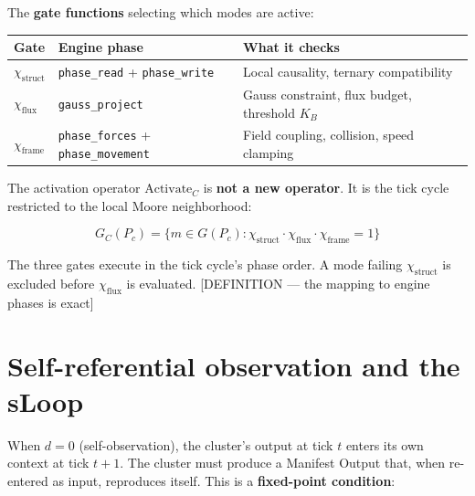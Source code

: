 \documentclass[
  11pt,
  letterpaper,
  twoside,
  openany]{book}
\makeatletter
\let\orig@section\section
\renewcommand{\section}{\needspace{8\baselineskip}\orig@section}
\makeatother
\begin{document}
The \textbf{gate functions} selecting which modes are active:

\begin{longtable}[]{@{}
  >{\raggedright\arraybackslash}p{}
  >{\raggedright\arraybackslash}p{}
  >{\raggedright\arraybackslash}p{}@{}}
\toprule\noalign{}
\begin{minipage}[b]{\linewidth}\raggedright
Gate
\end{minipage} & \begin{minipage}[b]{\linewidth}\raggedright
Engine phase
\end{minipage} & \begin{minipage}[b]{\linewidth}\raggedright
What it checks
\end{minipage} \\
\midrule\noalign{}
\endhead
\bottomrule\noalign{}
\endlastfoot
\(\chi_{\text{struct}}\) & \texttt{phase\_read} + \texttt{phase\_write}
& Local causality, ternary compatibility \\
\(\chi_{\text{flux}}\) & \texttt{gauss\_project} & Gauss constraint,
flux budget, threshold \(K_B\) \\
\(\chi_{\text{frame}}\) & \texttt{phase\_forces} +
\texttt{phase\_movement} & Field coupling, collision, speed clamping \\
\end{longtable}

The activation operator \(\text{Activate}_C\) is \textbf{not a new
operator}. It is the tick cycle restricted to the local Moore
neighborhood:

\[
G_C(P_c) = \{ m \in G(P_c) : \chi_{\text{struct}} \cdot \chi_{\text{flux}} \cdot \chi_{\text{frame}} = 1 \}
\]

The three gates execute in the tick cycle's phase order. A mode failing
\(\chi_{\text{struct}}\) is excluded before \(\chi_{\text{flux}}\) is
evaluated. {[}DEFINITION --- the mapping to engine phases is exact{]}

\section{Self-referential observation and the
sLoop}\label{self-referential-observation-and-the-sloop}

When \(d = 0\) (self-observation), the cluster's output at tick \(t\)
enters its own context at tick \(t+1\). The cluster must produce a
Manifest Output that, when re-entered as input, reproduces itself. This
is a \textbf{fixed-point condition}:
\end{document}
